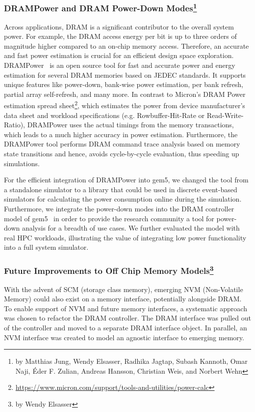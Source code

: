 \subsubsection[DRAMPower and DRAM Power-Down Modes]{DRAMPower and DRAM Power-Down Modes\footnote{by Matthias Jung, Wendy Elsasser, Radhika Jagtap, Subash Kannoth, Omar Naji, Éder F.
Zulian, Andreas Hansson, Christian Weis, and Norbert Wehn }}
%
Across applications, DRAM is a significant contributor to the overall system power.
For example, the DRAM access energy per bit is up to three orders of magnitude higher compared to an on-chip memory access.
Therefore, an accurate and fast power estimation is crucial for an efficient design space exploration.
DRAMPower~\cite{kargoo_14} is an open source tool for fast and accurate power and energy estimation for several DRAM memories based on JEDEC standards.
It supports unique features like power-down, bank-wise power estimation, per bank refresh, partial array self-refresh, and many more.
In contrast to Micron’s DRAM Power estimation spread sheet\footnote{\url{https://www.micron.com/support/tools-and-utilities/power-calc}}, which estimates the power from device manufacturer’s data sheet and workload specifications (e.g. Rowbuffer-Hit-Rate or Read-Write-Ratio), DRAMPower uses the actual timings from the memory transactions, which leads to a much higher accuracy in power estimation.
Furthermore, the DRAMPower tool performs DRAM command trace analysis based on memory state transitions and hence, avoids cycle-by-cycle evaluation, thus speeding up simulations.

For the efficient integration of DRAMPower into gem5, we changed the tool from a standalone simulator to a library that could be used in discrete event-based simulators for calculating the power consumption online during the simulation.
Furthermore, we integrate the power-down modes into the DRAM controller model of gem5~\cite{jagjun_17} in order to provide the research community a tool for power-down analysis for a breadth of use cases. We further evaluated the model with real HPC workloads, illustrating the value of integrating low power functionality into a full system simulator.
%
\subsubsection[Future Improvements to Off Chip Memory Models]{Future Improvements to Off Chip Memory Models\footnote{by Wendy Elsasser}}
\label{sec:nvm}

With the advent of SCM (storage class memory), emerging NVM (Non-Volatile Memory) could also exist on a memory interface, potentially alongside DRAM.
To enable support of NVM and future memory interfaces, a systematic approach was chosen to refactor the DRAM controller.
The DRAM interface was pulled out of the controller and moved to a separate DRAM interface object.
In parallel, an NVM interface was created to model an agnostic interface to emerging memory.

